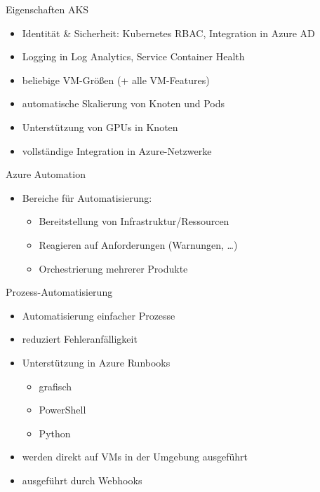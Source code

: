\begin{flashcard}[]{Eigenschaften AKS}
  \begin{itemize}
    \item Identität \& Sicherheit: Kubernetes RBAC, Integration in Azure AD
    \item Logging in Log Analytics, Service Container Health
    \item beliebige VM-Größen (+ alle VM-Features)
    \item automatische Skalierung von Knoten und Pods
    \item Unterstützung von GPUs in Knoten
    \item vollständige Integration in Azure-Netzwerke
  \end{itemize}
\end{flashcard}


\begin{flashcard}[]{Azure Automation}
  \begin{itemize}
    \item Bereiche für Automatisierung:
      \begin{itemize}
        \item Bereitstellung von Infrastruktur/Ressourcen
        \item Reagieren auf Anforderungen (Warnungen, \ldots)
        \item Orchestrierung mehrerer Produkte
      \end{itemize}
  \end{itemize}
\end{flashcard}

\begin{flashcard}[]{Prozess-Automatisierung}
  \begin{itemize}
    \item Automatisierung einfacher Prozesse
    \item reduziert Fehleranfälligkeit
    \item Unterstützung in Azure Runbooks\newline
      \begin{itemize}
        \item grafisch
        \item PowerShell
        \item Python
      \end{itemize}
    \item werden direkt auf VMs in der Umgebung ausgeführt
    \item ausgeführt durch Webhooks
  \end{itemize}
\end{flashcard}

